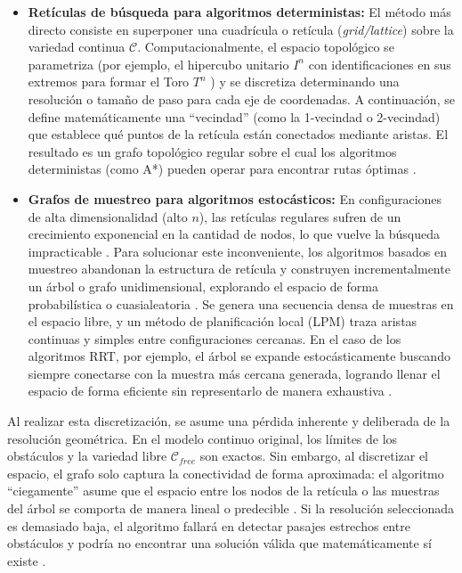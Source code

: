 \begin{itemize}
\item \textbf{Retículas de búsqueda para algoritmos deterministas:} El método más 
directo consiste en superponer una cuadrícula o retícula (\textit{grid/lattice}) 
sobre la variedad continua $\mathcal{C}$. Computacionalmente, el espacio topológico 
se parametriza (por ejemplo, el hipercubo unitario $I^n$ con identificaciones en 
sus extremos para formar el Toro $T^n$ \parencite{Mosquera2017}) y se discretiza 
determinando una resolución o tamaño de paso para cada eje de coordenadas. 
A continuación, se define matemáticamente una \enquote{vecindad} (como la 
1-vecindad o 2-vecindad) que establece qué puntos de la retícula están conectados 
mediante aristas. El resultado es un grafo topológico regular sobre el cual los 
algoritmos deterministas (como A*) pueden operar para encontrar rutas 
óptimas \parencite{lavalle2006planning}.

\item \textbf{Grafos de muestreo para algoritmos estocásticos:} En configuraciones 
de alta dimensionalidad (alto $n$), las retículas regulares sufren de un 
crecimiento exponencial en la cantidad de nodos, lo que vuelve la búsqueda 
impracticable \parencite{choset2005principles}. Para solucionar este inconveniente, 
los algoritmos basados en muestreo 
abandonan la estructura de retícula y construyen incrementalmente un árbol 
o grafo unidimensional, explorando el espacio de forma probabilística o 
cuasialeatoria \parencite{lavalle2006planning}. Se genera una secuencia densa de muestras en el 
espacio libre, y un método de planificación local (LPM) traza aristas 
continuas y simples entre configuraciones cercanas. En el caso de los 
algoritmos RRT, por ejemplo, el árbol se expande estocásticamente 
buscando siempre conectarse con la muestra más cercana generada, 
logrando llenar el espacio de forma eficiente sin representarlo de 
manera exhaustiva \parencite{lavalle2006planning}.
\end{itemize}

Al realizar esta discretización, se asume una pérdida inherente y 
deliberada de la resolución geométrica. En el modelo continuo original, 
los límites de los obstáculos y la variedad libre $\mathcal{C}_{free}$ 
son exactos. Sin embargo, al discretizar el espacio, el grafo solo 
captura la conectividad de forma aproximada: el algoritmo \enquote{ciegamente} 
asume que el espacio entre los nodos de la retícula o 
las muestras del árbol se comporta de manera lineal o predecible \parencite{choset2005principles}. Si la 
resolución seleccionada es demasiado baja, el algoritmo fallará en 
detectar pasajes estrechos entre obstáculos y 
podría no encontrar una solución válida que matemáticamente sí existe \parencite{lavalle2006planning}. 

